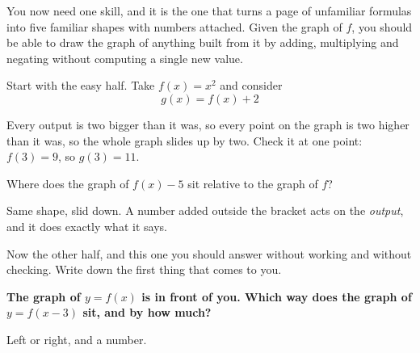 \begin{fr}
You now need one skill, and it is the one that turns a page of unfamiliar
formulas into five familiar shapes with numbers attached. Given the graph of
$f$, you should be able to draw the graph of anything built from it by adding,
multiplying and negating \dash{} without computing a single new value.

Start with the easy half. Take $f(x) = x^{2}$ and consider
\[ g(x) = f(x) + 2 \]

Every output is two bigger than it was, so every point on the graph is two
higher than it was, so the whole graph slides up by two. Check it at one point:
$f(3) = 9$, so $g(3) = 11$.

Where does the graph of $f(x) - 5$ sit relative to the graph of $f$?
\nextframe
\end{fr}

\begin{fr}
Same shape, slid down. A number added outside the bracket acts on the
\emph{output}, and it does exactly what it says.

Now the other half, and this one you should answer without working and without
checking. Write down the first thing that comes to you.

\textbf{The graph of $y = f(x)$ is in front of you. Which way does the graph of
$y = f(x - 3)$ sit, and by how much?}

Left or right, and a number.
\dotline
\nextframe
\end{fr}

